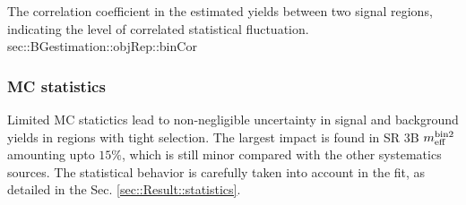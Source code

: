 {The correlation coefficient in the estimated yields between two signal regions, indicating the level of correlated statistical fluctuation.}
{sec::BGestimation::objRep::binCor}



\subsubsection{MC statistics}
Limited MC statictics lead to non-negligible uncertainty in signal and background yields in regions with tight selection. The largest impact is found in SR 3B $m_{\mathrm{eff}}^{\mathrm{bin 2}}$ amounting upto $15\%$, which is still minor compared with the other systematics sources. The statistical behavior is carefully taken into account in the fit, as detailed in the Sec. \ref{sec::Result::statistics}.








